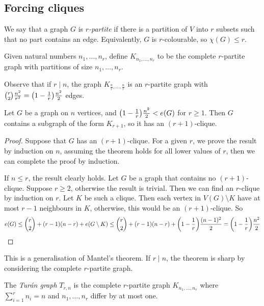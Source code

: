\subsection{Forcing cliques}
\begin{definition}
	We say that a graph \( G \) is \emph{\( r \)-partite} if there is a partition of \( V \) into \( r \) subsets such that no part contains an edge.
	Equivalently, \( G \) is \( r \)-colourable, so \( \chi(G) \leq r \).
\end{definition}
\begin{definition}
	Given natural numbers \( n_1, \dots, n_r \), define \( K_{n_1, \dots, n_r} \) to be the complete \( r \)-partite graph with partitions of size \( n_1, \dots, n_r \).
\end{definition}
Observe that if \( r \mid n \), the graph \( K_{\frac{n}{r}, \dots, \frac{n}{r}} \) is an \( r \)-partite graph with \( \binom r 2 \frac{n^2}{r^2} = \qty(1 - \frac{1}{r})\frac{n^2}{2} \) edges.
\begin{theorem}
	Let \( G \) be a graph on \( n \) vertices, and \( \qty(1 - \frac{1}{r}) \frac{n^2}{2} < e(G) \) for \( r \geq 1 \).
	Then \( G \) contains a subgraph of the form \( K_{r+1} \), so it has an \( (r + 1) \)-clique.
\end{theorem}
\begin{proof}
	Suppose that \( G \) has an \( (r + 1) \)-clique.
	For a given \( r \), we prove the result by induction on \( n \), assuming the theorem holds for all lower values of \( r \), then we can complete the proof by induction.
	
	If \( n \leq r \), the result clearly holds.
	Let \( G \) be a graph that contains no \( (r + 1) \)-clique.
	Suppose \( r \geq 2 \), otherwise the result is trivial.
	Then we can find an \( r \)-clique by induction on \( r \).
	Let \( K \) be such a clique.
	Then each vertex in \( V(G) \setminus K \) have at most \( r - 1 \) neighbours in \( K \), otherwise, this would be an \( (r + 1) \)-clique.
	So
	\[ e(G) \leq \binom r 2 + (r - 1)(n - r) + e(G \setminus K) \leq \binom r 2 + (r - 1)(n - r) + \qty(1 - \frac{1}{r})\frac{(n-1)^2}{2} = \qty(1 - \frac{1}{r}) \frac{n^2}{2} \]
\end{proof}
\begin{remark}
	This is a generalisation of Mantel's theorem.
	If \( r \mid n \), the theorem is sharp by considering the complete \( r \)-partite graph.
\end{remark}
\begin{definition}
	The \emph{Tur\'an graph} \( T_{r,n} \) is the complete \( r \)-partite graph \( K_{n_1, \dots, n_r} \) where \( \sum_{i=1}^r n_i = n \) and \( n_1, \dots, n_r \) differ by at most one.
\end{definition}
